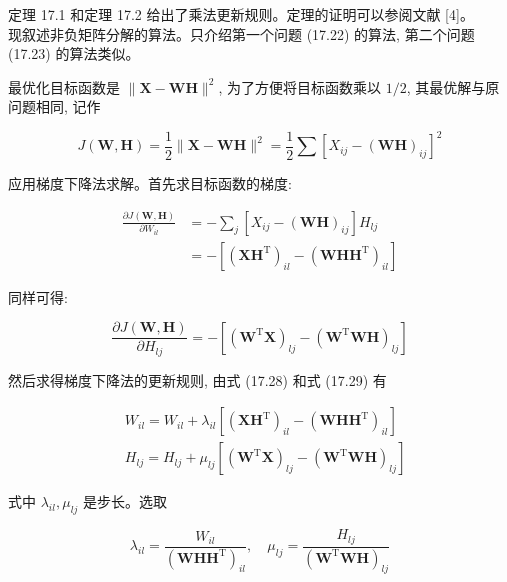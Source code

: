 \documentclass[10pt]{article}
\begin{document}
定理 17.1 和定理 17.2 给出了乘法更新规则。定理的证明可以参阅文献 [4]。\\
现叙述非负矩阵分解的算法。只介绍第一个问题 (17.22) 的算法, 第二个问题 (17.23) 的算法类似。

最优化目标函数是 $\|\boldsymbol{X}-\boldsymbol{W} \boldsymbol{H}\|^{2}$, 为了方便将目标函数乘以 $1 / 2$, 其最优解与原问题相同, 记作

$$
J(\boldsymbol{W}, \boldsymbol{H})=\frac{1}{2}\|\boldsymbol{X}-\boldsymbol{W} \boldsymbol{H}\|^{2}=\frac{1}{2} \sum\left[X_{i j}-(\boldsymbol{W} \boldsymbol{H})_{i j}\right]^{2}
$$

应用梯度下降法求解。首先求目标函数的梯度:


\begin{align*}
\frac{\partial J(\boldsymbol{W}, \boldsymbol{H})}{\partial W_{i l}} & =-\sum_{j}\left[X_{i j}-(\boldsymbol{W} \boldsymbol{H})_{i j}\right] H_{l j} \\
& =-\left[\left(\boldsymbol{X} \boldsymbol{H}^{\mathrm{T}}\right)_{i l}-\left(\boldsymbol{W} \boldsymbol{H} \boldsymbol{H}^{\mathrm{T}}\right)_{i l}\right] \tag{17.28}
\end{align*}


同样可得:


\begin{equation*}
\frac{\partial J(\boldsymbol{W}, \boldsymbol{H})}{\partial H_{l j}}=-\left[\left(\boldsymbol{W}^{\mathrm{T}} \boldsymbol{X}\right)_{l j}-\left(\boldsymbol{W}^{\mathrm{T}} \boldsymbol{W} \boldsymbol{H}\right)_{l j}\right] \tag{17.29}
\end{equation*}


然后求得梯度下降法的更新规则, 由式 (17.28) 和式 (17.29) 有


\begin{align*}
& W_{i l}=W_{i l}+\lambda_{i l}\left[\left(\boldsymbol{X} \boldsymbol{H}^{\mathrm{T}}\right)_{i l}-\left(\boldsymbol{W} \boldsymbol{H} \boldsymbol{H}^{\mathrm{T}}\right)_{i l}\right]  \tag{17.30}\\
& H_{l j}=H_{l j}+\mu_{l j}\left[\left(\boldsymbol{W}^{\mathrm{T}} \boldsymbol{X}\right)_{l j}-\left(\boldsymbol{W}^{\mathrm{T}} \boldsymbol{W} \boldsymbol{H}\right)_{l j}\right] \tag{17.31}
\end{align*}


式中 $\lambda_{i l}, \mu_{l j}$ 是步长。选取


\begin{equation*}
\lambda_{i l}=\frac{W_{i l}}{\left(\boldsymbol{W} \boldsymbol{H} \boldsymbol{H}^{\mathrm{T}}\right)_{i l}}, \quad \mu_{l j}=\frac{H_{l j}}{\left(\boldsymbol{W}^{\mathrm{T}} \boldsymbol{W} \boldsymbol{H}\right)_{l j}} \tag{17.32}
\end{equation*}
\end{document}
